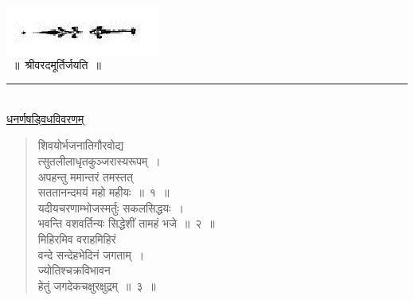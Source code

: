 \documentclass[11pt, openany]{book}
\begin{document}
\begin{center}
    \hspace{3mm}\includegraphics[scale=0.6]{Graphics/Capture3.JPG}\\
~॥~श्रीवरदमूर्तिर्जयति~॥\\
\rule{0.15\linewidth}{0.5pt}\\

\vspace{3mm}
 \label{dhanarna}
\underline{धनर्णषड्विधविवरणम्}
\end{center}
 \begin{quote}
     \qt
शिवयोर्भजनातिगौरवोद्य\textendash \\

\vspace{-5mm}
\hspace{0.5cm} त्सुतलीलाधृतकुञ्जरास्यरूपम्~। \\

\vspace{-5mm}
अपहन्तु ममान्तरं तमस्तत् \\

\vspace{-5mm}
\hspace{0.5cm} सततानन्दमयं महो महीयः~॥~१~॥\\

\vspace{-3mm}
यदीयचरणाम्भोजस्मर्तुः सकलसिद्धयः~। \\

\vspace{-5mm}
भवन्ति वशवर्तिन्यः सिद्धेशीं तामहं भजे~॥~२~॥\\

\vspace{-3mm}
मिहिरमिव वराहमिहिरं \\

\vspace{-5mm}
\hspace{0.5cm} वन्दे सन्देहभेदिनं जगताम्~। \\

\vspace{-5mm}
ज्योतिश्चक्रविभावन\textendash \\

\vspace{-5mm}
\hspace{0.5cm} हेतुं जगदेकचक्षुरक्षुद्रम्~॥~३~॥\\


\end{quote}
\end{document}

